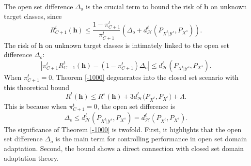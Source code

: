 \documentclass[journal]{IEEEtran}
\begin{document}
 
  The open set difference $\Delta_o$ is the crucial term to bound the risk of ${\bm h}$ on unknown target classes, since
\begin{equation}\label{EQ}
    R^t_{C+1}({\bm h})\leq \frac{1-\pi_{C+1}^t}{\pi_{C+1}^t}\left(\Delta_o+d_{\mathcal{H}}^{\ell}(P_{X^t|\mathcal{Y}^s},P_{X^s})\right).
\end{equation}
The risk of ${\bm h}$ on unknown target classes is intimately linked to the open set difference $\Delta_o$:
\begin{equation*}
    \left|\pi_{C+1}^tR^t_{C+1}({\bm h})- ({1-\pi_{C+1}^t})\Delta_o
    \right| \leq d_{\mathcal{H}}^{\ell}(P_{X^t|\mathcal{Y}^s},P_{X^s}).
\end{equation*}
When $\pi_{C+1}^t=0$, {Theorem \ref{-1000}} degenerates into the  closed set scenario with this theoretical bound \cite{DBLP:conf/nips/Ben-DavidBCP06}
\begin{equation*}
R^t({\bm h})\leq   {R^s({\bm h})} +{3{d_{\mathcal{H}}^{\ell}(P_{X^t}},P_{X^s})+\Lambda}.
\end{equation*}
This is because when $\pi_{C+1}^t=0$, the open set difference is
\begin{equation*}
\Delta_o\leq d_{\mathcal{H}}^{\ell}({P}_{X^t|\mathcal{Y}^s},P_{X^s})=d_{\mathcal{H}}^{\ell}(P_{X^t},P_{X^s}).
\end{equation*} 
The significance of {Theorem \ref{-1000}} is twofold. First, it highlights that the open set difference  $\Delta_o$ is the main term for controlling performance in open set domain adaptation. Second, the bound shows a direct connection with closed set domain adaptation theory. 
\end{document}
